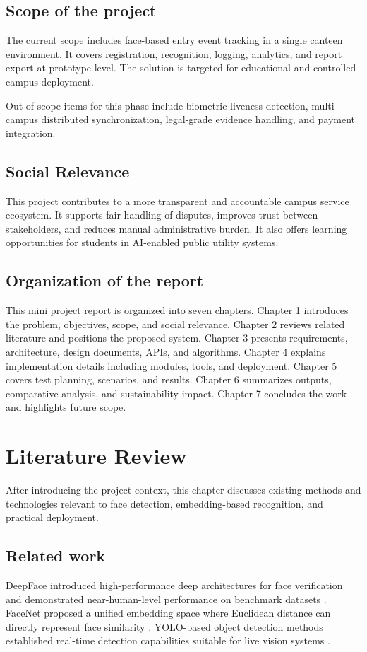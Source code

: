 \documentclass{fisatprojectfinal}
\begin{document}
\section{Scope of the project}
The current scope includes face-based entry event tracking in a single canteen environment. It covers registration, recognition, logging, analytics, and report export at prototype level. The solution is targeted for educational and controlled campus deployment.

Out-of-scope items for this phase include biometric liveness detection, multi-campus distributed synchronization, legal-grade evidence handling, and payment integration.

\section{Social Relevance}
This project contributes to a more transparent and accountable campus service ecosystem. It supports fair handling of disputes, improves trust between stakeholders, and reduces manual administrative burden. It also offers learning opportunities for students in AI-enabled public utility systems.

\section{Organization of the report}
This mini project report is organized into seven chapters. Chapter 1 introduces the problem, objectives, scope, and social relevance. Chapter 2 reviews related literature and positions the proposed system. Chapter 3 presents requirements, architecture, design documents, APIs, and algorithms. Chapter 4 explains implementation details including modules, tools, and deployment. Chapter 5 covers test planning, scenarios, and results. Chapter 6 summarizes outputs, comparative analysis, and sustainability impact. Chapter 7 concludes the work and highlights future scope.

\chapter{Literature Review}
After introducing the project context, this chapter discusses existing methods and technologies relevant to face detection, embedding-based recognition, and practical deployment.

\section{Related work}
DeepFace introduced high-performance deep architectures for face verification and demonstrated near-human-level performance on benchmark datasets \cite{deepface_framework}. FaceNet proposed a unified embedding space where Euclidean distance can directly represent face similarity \cite{facenet_paper}. YOLO-based object detection methods established real-time detection capabilities suitable for live vision systems \cite{yolo_paper}.
\end{document}

